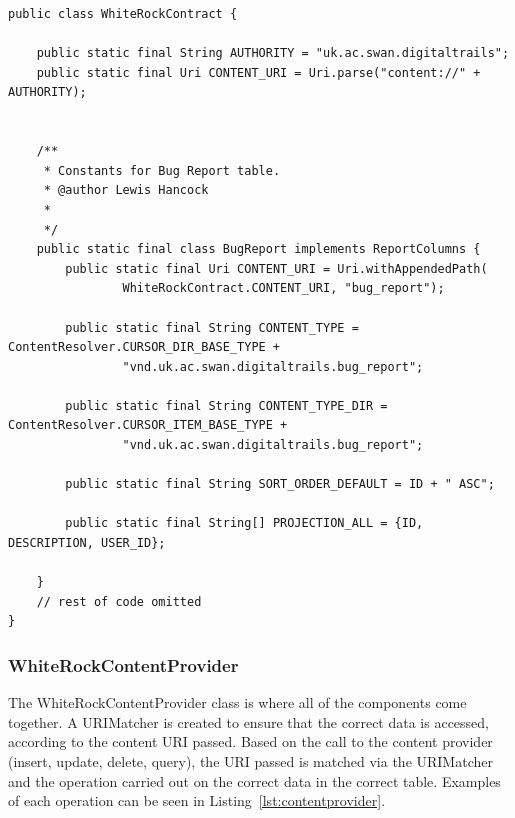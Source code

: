 \documentclass[11pt,a4paper]{article}
\begin{document}
\begin{lstlisting}[captionpos=b, caption=WhiteRockContract Snippet, label=lst:contract, frame=single]
public class WhiteRockContract {
	
	public static final String AUTHORITY = "uk.ac.swan.digitaltrails";
	public static final Uri CONTENT_URI = Uri.parse("content://" + AUTHORITY);


	/**
	 * Constants for Bug Report table.
	 * @author Lewis Hancock
	 *
	 */
	public static final class BugReport implements ReportColumns {
		public static final Uri CONTENT_URI = Uri.withAppendedPath(
				WhiteRockContract.CONTENT_URI, "bug_report");
	
		public static final String CONTENT_TYPE = ContentResolver.CURSOR_DIR_BASE_TYPE +
				"vnd.uk.ac.swan.digitaltrails.bug_report";
		
		public static final String CONTENT_TYPE_DIR = ContentResolver.CURSOR_ITEM_BASE_TYPE +
				"vnd.uk.ac.swan.digitaltrails.bug_report";
		
		public static final String SORT_ORDER_DEFAULT = ID + " ASC";
		
		public static final String[] PROJECTION_ALL = {ID, DESCRIPTION, USER_ID};

	}
	// rest of code omitted
}
\end{lstlisting}


\subsubsection{WhiteRockContentProvider}
The WhiteRockContentProvider class is where all of the components come together. A URIMatcher is created to ensure that the correct data is accessed, according to the content URI passed. Based on the call to the content provider (insert, update, delete, query), the URI passed is matched via the URIMatcher and the operation carried out on the correct data in the correct table. Examples of each operation can be seen in Listing~\ref{lst:contentprovider}.
\end{document}
